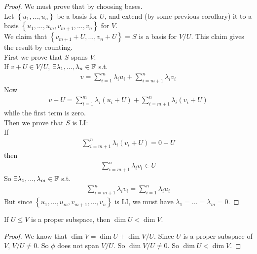 \documentclass[a4paper]{article}
\begin{document}
\begin{prop}
\begin{proof}
We must prove that by choosing bases.\\
Let $\left\{u_1,...,u_n\right\}$ be a basis for $U$, and extend (by some previous corollary) it to a basis $\left\{u_1,...,u_m,v_{m+1},...,v_n\right\}$ for $V$.\\
We claim that $\left\{v_{m+1}+U,...,v_n+U\right\} = S$ is a basis for $V/U$. This claim gives the result by counting.\\
First we prove that $S$ spans $V$:\\
If $v+U \in V/U$, $\exists \lambda_1,...,\lambda_n \in \mathbb{F}$ s.t.
\begin{equation*}
\begin{aligned}
v = \sum_{i=1}^m \lambda_i u_i + \sum_{i=m+1}^n \lambda_i v_i
\end{aligned}
\end{equation*}
Now
\begin{equation*}
\begin{aligned}
v+U = \sum_{i=1}^m \lambda_i\left(u_i+U\right) + \sum_{i=m+1}^n \lambda_i\left(v_i+U\right)
\end{aligned}
\end{equation*}
while the first term is zero.\\
Then we prove that $S$ is LI:\\
If 
\begin{equation*}
\begin{aligned}
\sum_{i=m+1}^n \lambda_i\left(v_i+U\right) = 0+U
\end{aligned}
\end{equation*}
then
\begin{equation*}
\begin{aligned}
\sum_{i=m+1}^n \lambda_i v_i \in U
\end{aligned}
\end{equation*}
So $\exists \lambda_1,...,\lambda_m \in \mathbb{F}$ s.t.
\begin{equation*}
\begin{aligned}
\sum_{i=m+1}^n \lambda_i v_i = \sum_{i=1}^n \lambda_i u_i
\end{aligned}
\end{equation*}
But since $\left\{u_1,...,u_m,v_{m+1},...,v_n\right\}$ is LI, we must have $\lambda_1 = ... = \lambda_m = 0$.
\end{proof}
\end{prop}

\begin{coro}
If $U \leq V$ is a proper subspace, then $\dim U < \dim V$.
\begin{proof}
We know that $\dim V = \dim U + \dim V/U$. Since $U$ is a proper subspace of $V$, $V/U \neq 0$. So $\phi$ does not span $V/U$. So $\dim V/U \neq 0$. So $\dim U < \dim V$.
\end{proof}
\end{coro}
\end{document}
